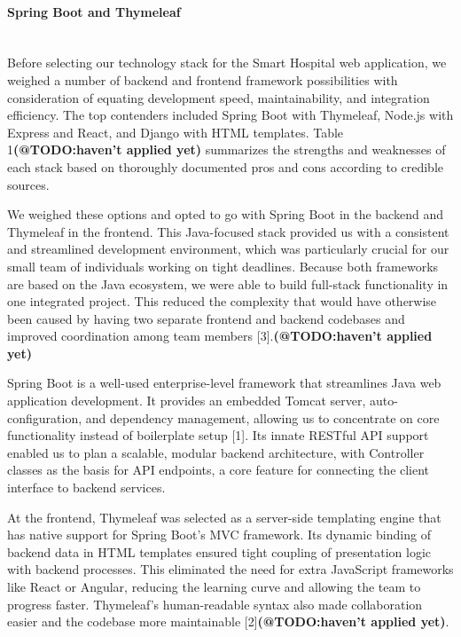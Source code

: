 \paragraph{Spring Boot and Thymeleaf}\mbox{}\\

Before selecting our technology stack for the Smart Hospital web application, we weighed a number of backend and frontend framework possibilities with consideration of equating development speed, maintainability, and integration efficiency. The top contenders included Spring Boot with Thymeleaf, Node.js with Express and React, and Django with HTML templates. Table 1\textbf{(@TODO:haven't applied yet)} summarizes the strengths and weaknesses of each stack based on thoroughly documented pros and cons according to credible sources.

We weighed these options and opted to go with Spring Boot in the backend and Thymeleaf in the frontend. This Java-focused stack provided us with a consistent and streamlined development environment, which was particularly crucial for our small team of individuals working on tight deadlines. Because both frameworks are based on the Java ecosystem, we were able to build full-stack functionality in one integrated project. This reduced the complexity that would have otherwise been caused by having two separate frontend and backend codebases and improved coordination among team members [3].\textbf{(@TODO:haven't applied yet)}

Spring Boot is a well-used enterprise-level framework that streamlines Java web application development. It provides an embedded Tomcat server, auto-configuration, and dependency management, allowing us to concentrate on core functionality instead of boilerplate setup [1]. Its innate RESTful API support enabled us to plan a scalable, modular backend architecture, with Controller classes as the basis for API endpoints, a core feature for connecting the client interface to backend services.

At the frontend, Thymeleaf was selected as a server-side templating engine that has native support for Spring Boot's MVC framework. Its dynamic binding of backend data in HTML templates ensured tight coupling of presentation logic with backend processes. This eliminated the need for extra JavaScript frameworks like React or Angular, reducing the learning curve and allowing the team to progress faster. Thymeleaf's human-readable syntax also made collaboration easier and the codebase more maintainable [2]\textbf{(@TODO:haven't applied yet)}.

